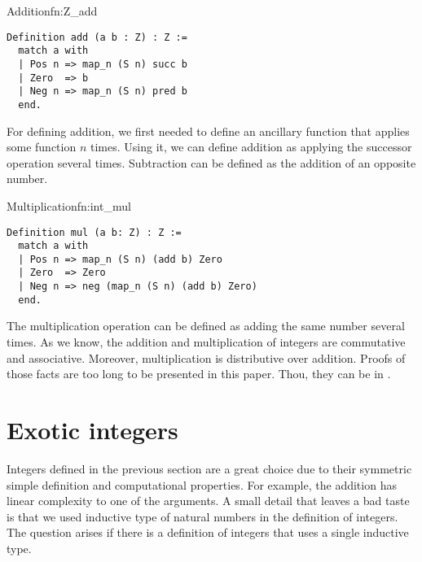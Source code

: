 \begin{func}{Addition}{fn:Z_add}
\begin{verbatim}
Definition add (a b : Z) : Z :=
  match a with 
  | Pos n => map_n (S n) succ b
  | Zero  => b
  | Neg n => map_n (S n) pred b
  end.
\end{verbatim}
\end{func}
For defining addition, we first needed to define an ancillary function that applies some function $n$ times. Using it, we can define addition as applying the successor operation several times. Subtraction can be defined as the addition of an opposite number.
\begin{func}{Multiplication}{fn:int_mul}
\begin{verbatim}
Definition mul (a b: Z) : Z :=
  match a with 
  | Pos n => map_n (S n) (add b) Zero
  | Zero  => Zero
  | Neg n => neg (map_n (S n) (add b) Zero)
  end.
\end{verbatim}
\end{func}
The multiplication operation can be defined as adding the same number several times. As we know, the addition and multiplication of integers are commutative and associative. Moreover, multiplication is distributive over addition. Proofs of those facts are too long to be presented in this paper. Thou, they can be in .
\section{Exotic integers}
Integers defined in the previous section are a great choice due to their symmetric simple definition and computational properties. For example, the addition has linear complexity to one of the arguments. A small detail that leaves a bad taste is that we used inductive type of natural numbers in the definition of integers. The question arises if there is a definition of integers that uses a single inductive type.

